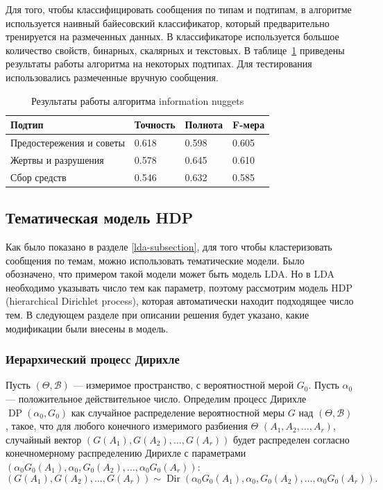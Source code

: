 \documentclass[12pt, a4paper]{article}
\DeclareMathOperator{\Dir}{Dir}
\DeclareMathOperator{\DP}{DP}
\begin{document}
	Для того, чтобы классифицировать сообщения по типам и подтипам, в алгоритме используется наивный байесовский классификатор, который предварительно тренируется на размеченных данных. В классификаторе используется большое количество свойств, бинарных, скалярных и текстовых. В таблице~\ref{nuggets-table} приведены результаты работы алгоритма на некоторых подтипах. Для тестирования использовались размеченные вручную сообщения.
	\begin{table}[h]
	\centering
	\caption{Результаты работы алгоритма information nuggets}
	\begin{tabular}{ l l l l}
	Подтип & Точность & Полнота & F-мера \\ \hline
	Предостережения и советы & 0.618 & 0.598 & 0.605 \\ 
	Жертвы и разрушения & 0.578 & 0.645 & 0.610 \\ 
	Сбор средств & 0.546 & 0.632 & 0.585 \\ \hline
	\end{tabular}
	
	\label{nuggets-table}
	\end{table}
	
	\subsection{Тематическая модель HDP}
  Как было показано в разделе \ref{lda-subsection}, для того чтобы кластеризовать сообщения по темам, можно использовать тематические модели. Было обозначено, что примером такой модели может быть модель LDA. Но в LDA необходимо указывать число тем как параметр, поэтому рассмотрим модель HDP (hierarchical Dirichlet process), которая автоматически находит подходящее число тем. В следующем разделе при описании решения будет указано, какие модификации были внесены в модель.
  
	\subsubsection{Иерархический процесс Дирихле}
  Пусть $(\Theta, \mathcal{B})$ --- измеримое пространство, с вероятностной мерой $G_0$. Пусть $\alpha_0$ --- положительное действительное число. Определим процесс Дирихле $\DP(\alpha_0, G_0)$ как случайное распределение вероятностной меры $G$ над $(\Theta, \mathcal{B})$, такое, что для любого конечного измеримого разбиения $\Theta$ $(A_1, A_2, \ldots, A_r)$, случайный вектор $(G(A_1), G(A_2), \ldots, G(A_r))$ будет распределен согласно конечномерному распределению Дирихле с параметрами $(\alpha_0 G_0(A_1), \alpha_0, G_0(A_2), \ldots, \alpha_0 G_0 (A_r))$:
  \begin{equation}
  (G(A_1), G(A_2), \ldots, G(A_r)) \sim \Dir(\alpha_0 G_0(A_1), \alpha_0, G_0(A_2), \ldots, \alpha_0 G_0 (A_r)).
  \end{equation}
  
\end{document}
